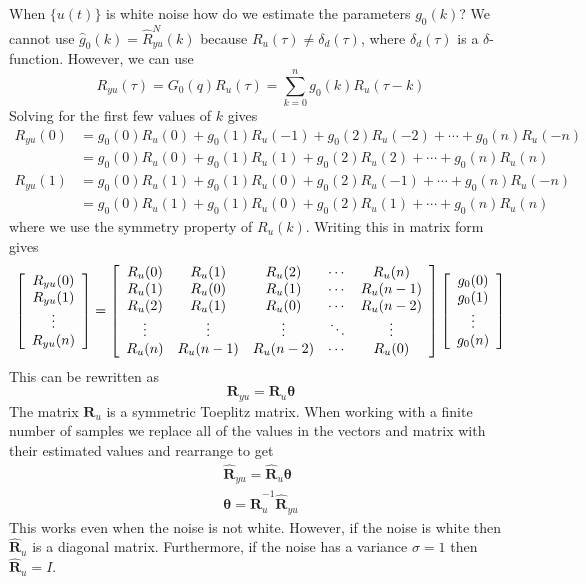 \documentclass[lecture,12pt,]{pcms-l}
\theoremstyle{example}
\begin{document}
When $\{u(t)\}$ is white noise how do we estimate the parameters $g_0(k)$? We cannot use $\hat{g}_0(k) = \hat{R}_{yu}^N(k)$ because $R_u(\tau)\neq \delta_d(\tau)$, where $\delta_d(\tau)$ is a $\delta$-function. However, we can use
$$R_{yu}(\tau) = G_0(q)R_u(\tau) = \sum_{k=0}^ng_0(k)R_u(\tau-k)$$
Solving for the first few values of $k$ gives
\begin{align*}
R_{yu}(0) &= g_0(0)R_u(0) + g_0(1)R_u(-1) + g_0(2)R_u(-2) + \cdots + g_0(n)R_u(-n) \\
&= g_0(0)R_u(0) + g_0(1)R_u(1) + g_0(2)R_u(2) + \cdots + g_0(n)R_u(n) \\
R_{yu}(1) &= g_0(0)R_u(1) + g_0(1)R_u(0) + g_0(2)R_u(-1) + \cdots + g_0(n)R_u(-n) \\
&= g_0(0)R_u(1) + g_0(1)R_u(0) + g_0(2)R_u(1) + \cdots + g_0(n)R_u(n)
\end{align*}
where we use the symmetry property of $R_u(k)$. Writing this in matrix form gives
\begin{align*}
\left[\begin{array}{c}
R_{yu}(0) \\ R_{yu}(1) \\ \vdots \\ R_{yu}(n)
\end{array}\right] =
\left[\begin{array}{c c c c c}
R_u(0) & R_u(1) & R_u(2) & \cdots & R_u(n) \\
R_u(1) & R_u(0) & R_u(1) & \cdots & R_u(n-1) \\
R_u(2) & R_u(1) & R_u(0) & \cdots & R_u(n-2) \\
\vdots & \vdots & \vdots & \ddots & \vdots \\
R_u(n) & R_u(n-1) & R_u(n-2) & \cdots & R_u(0)
\end{array}\right]
\left[\begin{array}{c}
g_0(0) \\ g_0(1) \\ \vdots \\ g_0(n)
\end{array}\right]
\end{align*}
This can be rewritten as
$$\mathbf{R}_{yu} = \mathbf{R}_u\mathbf{\theta}$$
The matrix $\mathbf{R}_u$ is a symmetric Toeplitz matrix. When working with a finite number of samples we replace all of the values in the vectors and matrix with their estimated values and rearrange to get
\begin{align*}
\hat{\mathbf{R}}_{yu} = \hat{\mathbf{R}}_u\mathbf{\theta} \\
\mathbf{\theta} = \hat{\mathbf{R}}_u^{-1}\hat{\mathbf{R}}_{yu}
\end{align*}
This works even when the noise is not white. However, if the noise is white then $\hat{\mathbf{R}}_u$ is a diagonal matrix. Furthermore, if the noise has a variance $\sigma=1$ then $\hat{\mathbf{R}}_u=I$.
\end{document}
